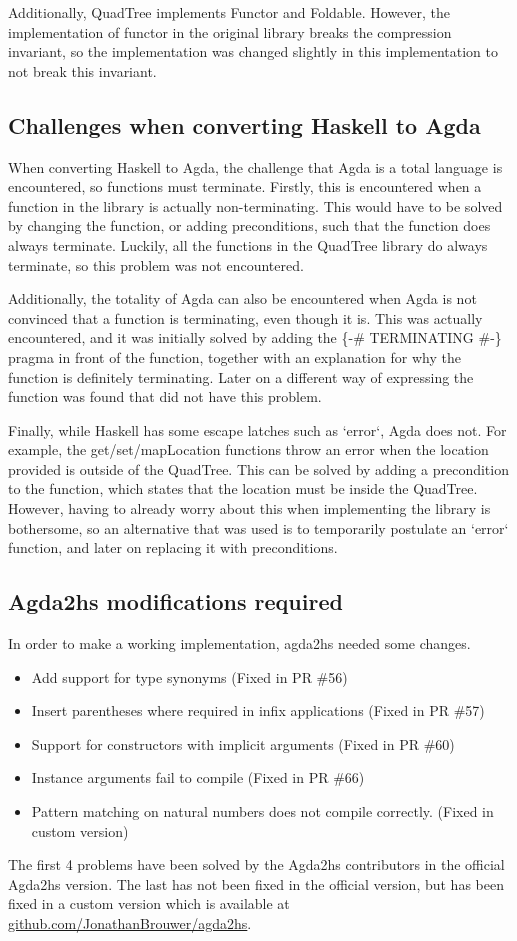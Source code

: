 Additionally, QuadTree implements Functor and Foldable. However, the implementation of functor in the original library breaks the compression invariant, so the implementation was changed slightly in this implementation to not break this invariant.

\subsection{Challenges when converting Haskell to Agda}
When converting Haskell to Agda, the challenge that Agda is a total language is encountered, so functions must terminate. Firstly, this is encountered when a function in the library is actually non-terminating. This would have to be solved by changing the function, or adding preconditions, such that the function does always terminate. Luckily, all the functions in the QuadTree library do always terminate, so this problem was not encountered. 

Additionally, the totality of Agda can also be encountered when Agda is not convinced that a function is terminating, even though it is. This was actually encountered, and it was initially solved by adding the \{-\# TERMINATING \#-\} pragma in front of the function, together with an explanation for why the function is definitely terminating. Later on a different way of expressing the function was found that did not have this problem.

Finally, while Haskell has some escape latches such as `error`, Agda does not. For example, the get/set/mapLocation functions throw an error when the location provided is outside of the QuadTree. This can be solved by adding a precondition to the function, which states that the location must be inside the QuadTree. However, having to already worry about this when implementing the library is bothersome, so an alternative that was used is to temporarily postulate an `error` function, and later on replacing it with preconditions.

\subsection{Agda2hs modifications required}
In order to make a working implementation, agda2hs needed some changes.
\begin{itemize}
    \item Add support for type synonyms (Fixed in PR \#56)
    \item Insert parentheses where required in infix applications (Fixed in PR \#57)
    \item Support for constructors with implicit arguments (Fixed in PR \#60)
    \item Instance arguments fail to compile (Fixed in PR \#66)
    \item Pattern matching on natural numbers does not compile correctly. (Fixed in custom version)
\end{itemize}
The first 4 problems have been solved by the Agda2hs contributors in the official Agda2hs version. The last has not been fixed in the official version, but has been fixed in a custom version which is available at \textcolor{blue}{\href{https://github.com/JonathanBrouwer/agda2hs}{github.com/JonathanBrouwer/agda2hs}}.